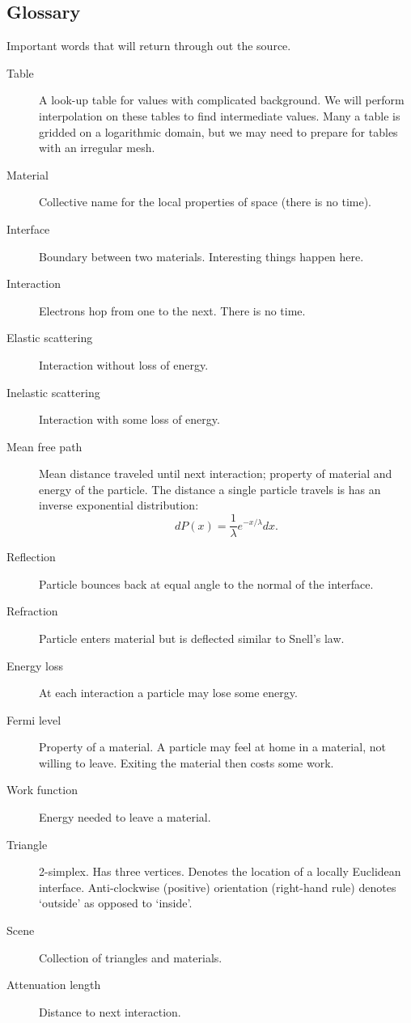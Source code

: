 \documentclass{article}
\theoremstyle{definition}
\begin{document}
\subsection{Glossary}
Important words that will return through out the source.
\begin{description}
    \item[Table] A look-up table for values with complicated background. We will perform interpolation on these tables to find intermediate values. Many a table is gridded on a logarithmic domain, but we may need to prepare for tables with an irregular mesh.
    \item[Material] Collective name for the local properties of space (there is no time).
    \item[Interface] Boundary between two materials. Interesting things happen here.
    \item[Interaction] Electrons hop from one to the next. There is no time.
    \item[Elastic scattering] Interaction without loss of energy.
    \item[Inelastic scattering] Interaction with some loss of energy.
    \item[Mean free path] Mean distance traveled until next interaction; property of material and energy of the particle. The distance a single particle travels is has an inverse exponential distribution:
        \[dP(x) = \frac{1}{\lambda} e^{-x/\lambda} dx.\]
    \item[Reflection] Particle bounces back at equal angle to the normal of the interface.
    \item[Refraction] Particle enters material but is deflected similar to Snell's law.
    \item[Energy loss] At each interaction a particle may lose some energy.
    \item[Fermi level] Property of a material. A particle may feel at home in a material, not willing to leave. Exiting the material then costs some work.
    \item[Work function] Energy needed to leave a material.
    \item[Triangle] 2-simplex. Has three vertices. Denotes the location of a locally Euclidean interface. Anti-clockwise (positive) orientation (right-hand rule) denotes `outside' as opposed to `inside'.
    \item[Scene] Collection of triangles and materials.
    \item[Attenuation length] Distance to next interaction.
\end{description}
\end{document}
